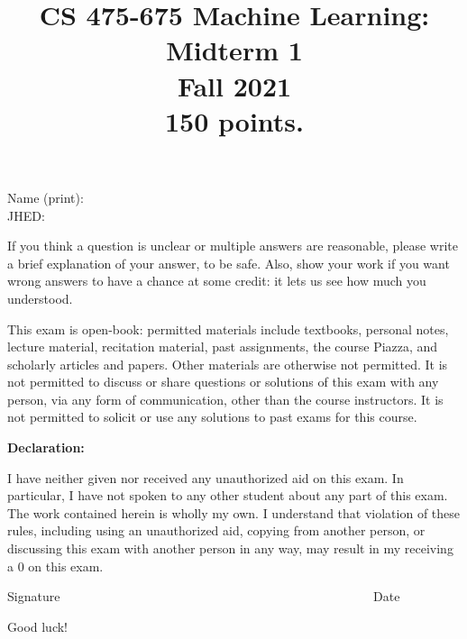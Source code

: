 \documentclass[11pt]{article}
\title{CS 475-675 Machine Learning: Midterm 1\\
\Large{Fall 2021}\\
150 points. }
\author{}
\date{}
\begin{document}
\large
\maketitle
\thispagestyle{headings}

\vspace{-.5in}
\noindent Name (print):
\underline{} \\

\noindent JHED:
\underline{}


 \vspace{3cm}
 If you think a question is unclear or multiple answers are reasonable, please write a brief explanation of your answer,
 to be safe. Also, show your work if you want wrong answers to have a chance at some credit: it lets us see how much you understood.

 This exam is open-book: permitted materials include textbooks, personal notes, lecture material, recitation material, past assignments, the course Piazza, and scholarly articles and papers. Other materials are otherwise not permitted. It is not permitted to discuss or share questions or solutions of this exam with any person, via any form of communication, other than the course instructors.  It is not permitted to solicit or use any solutions to past exams for this course.
 \vspace{1cm}

 \textbf{ Declaration:}

I have neither given nor received any unauthorized aid on this exam. In particular, I have not spoken to any other student about any part of this exam.
The work contained herein is wholly my own.  I understand that violation of these rules, including using an unauthorized aid, copying from another person,
or discussing this exam with another person in any way, may result in my receiving a 0 on this exam.
\begin{center}
\noindent\underline{}

 Signature ~~~~~~~~~~~~~~~~~~~~~~~~~~~~~~~~~~~~~~~~~~~~~~~~~Date


 \vspace{3cm}
 Good luck!
 \end{center}


\newpage

%
%
%
%
\end{document}

